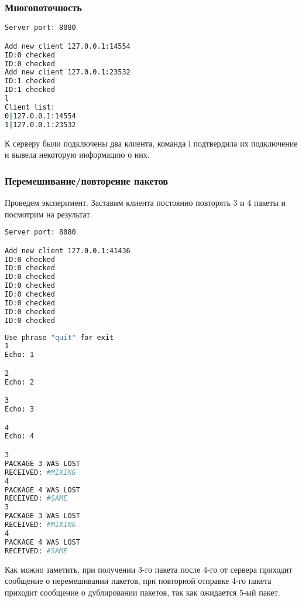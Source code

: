 \subsubsection{Многопоточность}

\begin{lstlisting}[language=bash, caption=Лог сервера]
Server port: 8080

Add new client 127.0.0.1:14554
ID:0 checked
ID:0 checked
Add new client 127.0.0.1:23532
ID:1 checked
ID:1 checked
l
Client list:
0|127.0.0.1:14554
1|127.0.0.1:23532

\end{lstlisting}

К серверу были подключены два клиента, команда l подтвердила их подключение и
вывела некоторую информацию о них.


\subsubsection{Перемешивание/повторение пакетов}

Проведем эксперимент. Заставим клиента постоянно повторять 3 и 4 пакеты и посмотрим на результат.

\begin{lstlisting}[language=bash, caption=Лог сервера]
Server port: 8080

Add new client 127.0.0.1:41436
ID:0 checked
ID:0 checked
ID:0 checked
ID:0 checked
ID:0 checked
ID:0 checked
ID:0 checked
ID:0 checked

\end{lstlisting}

\begin{lstlisting}[language=bash, caption=Лог клиента]
Use phrase "quit" for exit
1
Echo: 1

2
Echo: 2

3
Echo: 3

4
Echo: 4

3
PACKAGE 3 WAS LOST
RECEIVED: #MIXING
4
PACKAGE 4 WAS LOST
RECEIVED: #SAME
3
PACKAGE 3 WAS LOST
RECEIVED: #MIXING
4
PACKAGE 4 WAS LOST
RECEIVED: #SAME
\end{lstlisting}

Как можно заметить, при получении 3-го пакета после 4-го от сервера приходит сообщение о перемешивании пакетов, при повторной отправке 4-го пакета приходит сообщение о дублировании пакетов, так как ожидается 5-ый пакет.